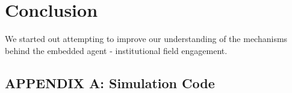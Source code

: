 \documentclass[12pt,letterpaper]{article}
\begin{document}
\section{Conclusion}
We started out attempting to improve our understanding of the mechanisms behind the embedded agent - institutional field engagement. 

\newpage
\begin{singlespace}
 

\end{singlespace}

\newpage
\appendix
\begin{singlespace}
\section{APPENDIX A: Simulation Code}

\end{singlespace}
\end{document}
